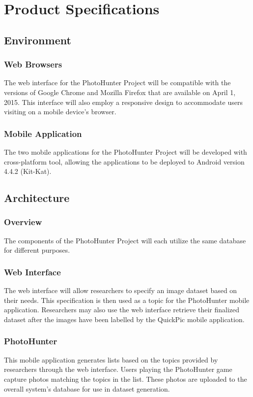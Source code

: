 \documentclass{article}
\begin{document}
\section{Product Specifications}

\subsection{Environment}

\subsubsection{Web Browsers}
The web interface for the PhotoHunter Project will be compatible with the
versions of Google Chrome and Mozilla Firefox that are available on April 1,
2015. This interface will also employ a responsive design to accommodate users
visiting on a mobile device's browser.

\subsubsection{Mobile Application}
The two mobile applications for the PhotoHunter Project will be developed with
cross-platform tool, allowing the applications to be deployed to Android
version 4.4.2 (Kit-Kat).

\subsection{Architecture}

\subsubsection{Overview}
The components of the PhotoHunter Project will each utilize the same database
for different purposes.

\subsubsection{Web Interface}
The web interface will allow researchers to specify an image dataset based on
their needs. This specification is then used as a topic for the PhotoHunter
mobile application. Researchers may also use the web interface retrieve their
finalized dataset after the images have been labelled by the QuickPic mobile
application.

\subsubsection{PhotoHunter}
This mobile application generates lists based on the topics provided by
researchers through the web interface. Users playing the PhotoHunter game
capture photos matching the topics in the list. These photos are uploaded to
the overall system's database for use in dataset generation.
\end{document}
